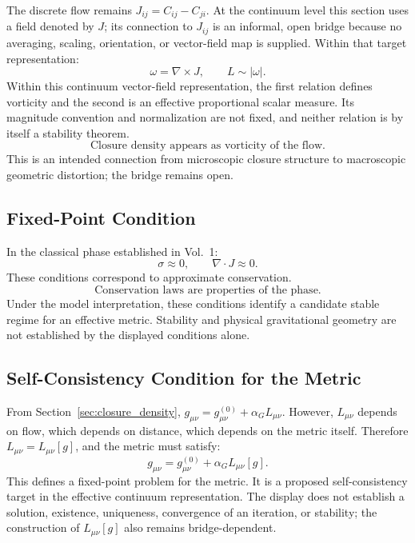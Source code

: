 The discrete flow remains $J_{ij}=C_{ij}-C_{ji}$. At the continuum level this
section uses a field denoted by $J$; its connection to $J_{ij}$ is an informal,
open bridge because no averaging, scaling, orientation, or vector-field map is
supplied. Within that target representation:
\begin{equation}
  \omega = \nabla \times J, \qquad L \sim |\omega|.
\end{equation}
Within this continuum vector-field representation, the first relation defines
vorticity and the second is an effective proportional scalar measure. Its
magnitude convention and normalization are not fixed, and neither relation is
by itself a stability theorem.
\begin{equation}
  \boxed{\text{Closure density appears as vorticity of the flow.}}
\end{equation}
This is an intended connection from microscopic closure structure to
macroscopic geometric distortion; the bridge remains open.

\subsection{Fixed-Point Condition}

In the classical phase established in Vol.~1:
\begin{equation}
  \sigma \approx 0, \qquad \nabla \cdot J \approx 0.
\end{equation}
These conditions correspond to approximate conservation.
\begin{equation}
  \boxed{\text{Conservation laws are properties of the phase.}}
\end{equation}
Under the model interpretation, these conditions identify a candidate stable
regime for an effective metric.  Stability and physical gravitational geometry
are not established by the displayed conditions alone.

\subsection{Self-Consistency Condition for the Metric}

From Section~\ref{sec:closure_density},
$g_{\mu\nu} = g^{(0)}_{\mu\nu} + \alpha_G L_{\mu\nu}$.
However, $L_{\mu\nu}$ depends on flow, which depends on distance,
which depends on the metric itself.
Therefore $L_{\mu\nu} = L_{\mu\nu}[g]$, and the metric must satisfy:
\begin{equation}
  \label{eq:fixed_point_metric}
  \boxed{g_{\mu\nu} = g^{(0)}_{\mu\nu} + \alpha_G L_{\mu\nu}[g].}
\end{equation}
This defines a fixed-point problem for the metric.
It is a proposed self-consistency target in the effective continuum
representation. The display does not establish a solution, existence,
uniqueness, convergence of an iteration, or stability; the construction of
$L_{\mu\nu}[g]$ also remains bridge-dependent.

